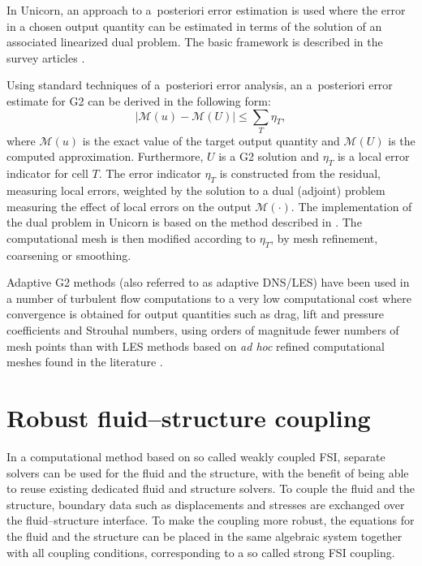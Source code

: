 In Unicorn, an approach to a~posteriori error estimation is used where
the error in a chosen output quantity can be estimated in terms of the
solution of an associated linearized dual problem. The basic framework
is described in the survey articles
\citep{ErikssonEstepEtAl1995,BeckerRannacher2001,GilesSuli2002}.

Using standard techniques of a~posteriori error analysis, an
a~posteriori error estimate for G2 can be derived in the following
form:
\begin{equation}
\vert \mathcal{M}(u) - \mathcal{M}(U) \vert \leqslant \sum_T \eta_T,
\end{equation}
where $\mathcal{M}(u)$ is the exact value of the target output
quantity and $\mathcal{M}(U)$ is the computed
approximation. Furthermore, $U$ is a G2 solution and $\eta_T$ is a
local error indicator for cell $T$. The error indicator $\eta_T$ is
constructed from the residual, measuring local errors, weighted by the
solution to a dual (adjoint) problem measuring the effect of local
errors on the output $\mathcal{M}(\cdot)$. The implementation of the
dual problem in Unicorn is based on the \cgone{}\cgone{} method
described in \citet{HoffmanJohnson2007}. The computational mesh is
then modified according to $\eta_T$, by mesh refinement, coarsening or
smoothing.

Adaptive G2 methods (also referred to as adaptive DNS/LES) have been
used in a number of turbulent flow computations to a very low
computational cost where convergence is obtained for output quantities
such as drag, lift and pressure coefficients and Strouhal numbers,
using orders of magnitude fewer numbers of mesh points than with LES
methods based on \emph{ad hoc} refined computational meshes found in
the literature
\citep{Hoffman2005,HoffmanJohnson2006b,Hoffman2006,Hoffman2009,HoffmanJansson2009,VilelaJanssonEtAl2010}.

\section{Robust fluid--structure coupling}

In a computational method based on so called weakly coupled FSI,
separate solvers can be used for the fluid and the structure, with the
benefit of being able to reuse existing dedicated fluid and structure
solvers. To couple the fluid and the structure, boundary data such as
displacements and stresses are exchanged over the fluid--structure
interface. To make the coupling more robust, the equations for the
fluid and the structure can be placed in the same algebraic system
together with all coupling conditions, corresponding to a so called
strong FSI coupling.

